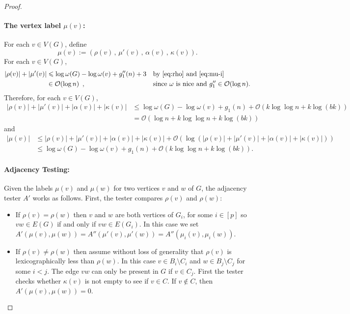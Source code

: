 \documentclass{patmorin}
\renewcommand{\le}{\leqslant}
\renewcommand{\leq}{\leqslant}
\newcommand{\Oh}{\mathcal{O}}
\let\eqref\cref
\begin{document}
\begin{proof}
    \paragraph{\boldmath The vertex label $\mu(v)$:}
    For each $v\in V(G)$, define
    \[
      \mu(v):=
        (\rho(v)\,,\, \mu'(v)\,,\, \alpha(v)\,,\, \kappa(v)).
    \]
For each $v\in V(G)$,  
    \begin{align*}
       |\rho(v)|+|\mu'(v)|
       & \le \log\omega(G)-\log\omega(v)+g_1''(n)+3&&\textrm{by~\eqref{eq:rho} and~\eqref{eq:mu-i}}\\
       & \in \Oh(\log n) \enspace , &&\textrm{since $\omega$ is nice and $g_1''\in\Oh(\log n)$.}
       \label{rho_mu_len}
    \end{align*}
Therefore, for each $v\in V(G)$,
    \begin{align*}
      |\rho(v)|+|\mu'(v)| + |\alpha(v)| + |\kappa(v)|
      &\leq
      \log\omega(G)-\log\omega(v) + g_1(n) + \Oh(k\log\log n+k\log(bk))\\
      &=\Oh(\log n + k\log\log n+k\log(bk))
      \end{align*}
      and
      \begin{align*}
      |\mu(v)| &\leq |\rho(v)|+|\mu'(v)| + |\alpha(v)| + |\kappa(v)| + \Oh(\log(|\rho(v)|+|\mu'(v)| + |\alpha(v)| + |\kappa(v)|))\\
      &\leq \log\omega(G)-\log\omega(v) + g_1(n) + \Oh(k\log\log n+k\log(bk)).
    \end{align*}

     \paragraph{Adjacency Testing:}
     Given the labels $\mu(v)$ and $\mu(w)$ for two vertices $v$ and $w$ of $G$, the adjacency tester $A'$ works as follows. First, the tester compares $\rho(v)$ and $\rho(w)$:
     \begin{itemize}
       \item If $\rho(v)=\rho(w)$ then $v$ and $w$ are both vertices of $G_i$, for some $i\in[p]$ so $vw\in E(G)$ if and only if $vw\in E(G_i)$.  In this case we set $A'(\mu(v),\mu(w))=A''(\mu'(v),\mu'(w))=A''(\mu_i(v),\mu_i(w))$.
       \item If $\rho(v)\neq\rho(w)$ then assume without loss of generality that $\rho(v)$ is lexicographically less than $\rho(w)$.
       In this case $v\in B_i\setminus C_i$ and $w\in B_j\setminus C_j$ for some $i < j$.
       The edge $vw$ can only be present in $G$ if $v\in C_j$.
       First the tester checks whether $\kappa(v)$ is not empty to see if $v\in C$.
       If $v\not\in C$, then $A'(\mu(v),\mu(w))=0$.


\end{itemize}
\end{proof}
\end{document}

